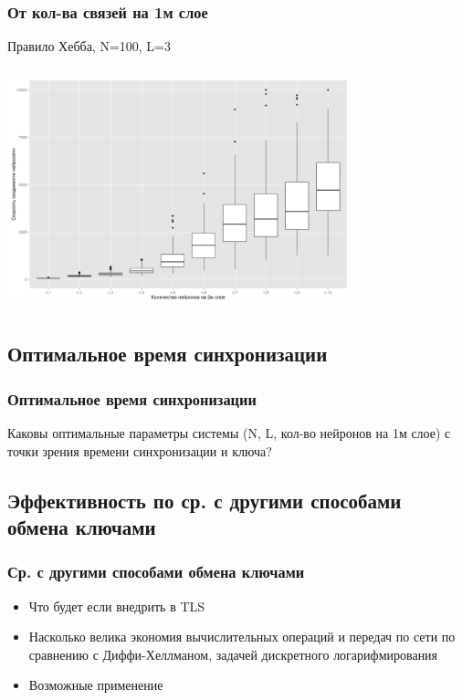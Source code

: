 \documentclass{beamer}
\begin{document}
\begin{frame}
\frametitle{От кол-ва связей на 1м слое}
Правило Хебба, N=100, L=3
\begin{center}
\includegraphics[width=10cm, height=7cm]{../../plots/n100L3_pn_vs_Tsync.png}

\end{center}
\end{frame}


\subsection{Оптимальное время синхронизации}
\begin{frame}
\frametitle{Оптимальное время синхронизации}
Каковы оптимальные параметры системы (N, L, кол-во нейронов на 1м слое) с точки зрения времени синхронизации и ключа?

\end{frame}


\subsection{Эффективность по ср. с другими способами обмена ключами}
\begin{frame}
\frametitle{Ср. с другими способами обмена ключами}
\begin{itemize}

\item Что будет если внедрить в TLS
\item Насколько велика экономия вычислительных операций и передач по сети по сравнению с Диффи-Хеллманом, задачей дискретного логарифмирования
\item Возможные применение
\end{itemize}

\end{frame}
\end{document}
